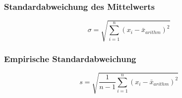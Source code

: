 \subsubsection{Standardabweichung des Mittelwerts}
\begin{equation}
    \sigma = \sqrt{\sum_{i=1}^n (x_i - \bar{x}_{arithm})^2}
    \label{eqn:StandardabweichungM}
\end{equation}
\subsubsection{Empirische Standardabweichung}
\begin{equation}
    s = \sqrt{\frac{1}{n - 1} \sum_{i=1}^n (x_i - \bar{x}_{arithm})^2}
    \label{eqn:StandardabweichungE}
\end{equation}
